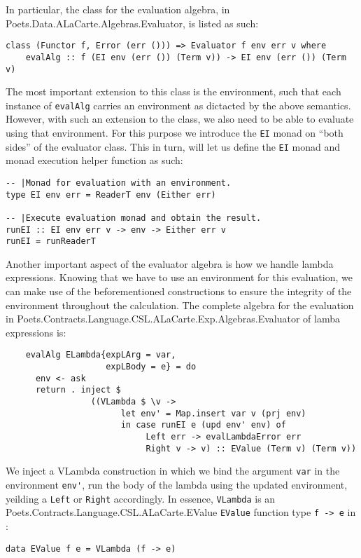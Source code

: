 \documentclass[10pt,a4paper,final,oneside,openany,article]{memoir}
\begin{document}
In particular, the class for the evaluation algebra, in
Poets.Data.ALaCarte.Algebras.Evaluator, is listed as such:
\lstset{language=Haskell}
\begin{lstlisting}
class (Functor f, Error (err ())) => Evaluator f env err v where
    evalAlg :: f (EI env (err ()) (Term v)) -> EI env (err ()) (Term v)
\end{lstlisting}
The most important extension to this class is the environment, such that
each instance of \lstinline{evalAlg} carries an environment as dictacted
by the above semantics. However, with such an extension to the class, we
also need to be able to evaluate using that environment. For this
purpose we introduce the \lstinline{EI} monad on ``both sides'' of the
evaluator class. This in turn, will let us define the \lstinline{EI}
monad and monad execution helper function as such:
\begin{lstlisting}
-- |Monad for evaluation with an environment.
type EI env err = ReaderT env (Either err)

-- |Execute evaluation monad and obtain the result.
runEI :: EI env err v -> env -> Either err v
runEI = runReaderT
\end{lstlisting}

Another important aspect of the evaluator algebra is how we handle
lambda expressions. Knowing that we have to use an environment for this
evaluation, we can make use of the beforementioned constructions to
ensure the integrity of the environment throughout the calculation.
The complete algebra for the evaluation in
Poets.Contracts.Language.CSL.ALaCarte.Exp.Algebras.Evaluator of lamba
expressions is:
\begin{lstlisting}
    evalAlg ELambda{expLArg = var,
                    expLBody = e} = do
      env <- ask
      return . inject $
                 ((VLambda $ \v ->
                       let env' = Map.insert var v (prj env)
                       in case runEI e (upd env' env) of
                            Left err -> evalLambdaError err
                            Right v -> v) :: EValue (Term v) (Term v))
\end{lstlisting}
We inject a VLambda construction in which we bind the argument
\lstinline{var} in the environment \lstinline{env'}, run the body of the
lambda using the updated environment, yeilding a \lstinline{Left} or
\lstinline{Right} accordingly. In essence, \lstinline{VLambda} is an
Poets.Contracts.Language.CSL.ALaCarte.EValue \lstinline{EValue} function
type \lstinline{f -> e} in :
\begin{lstlisting}
data EValue f e = VLambda (f -> e)
\end{lstlisting}
\end{document}
